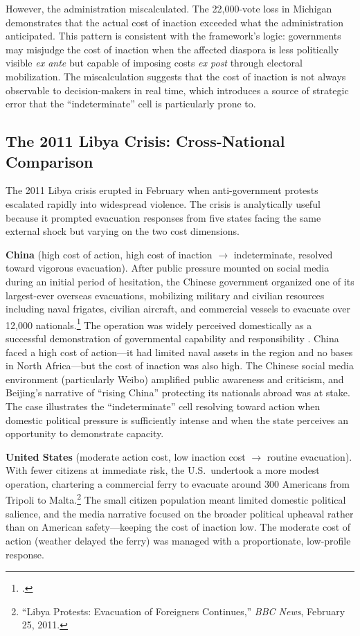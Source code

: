 \documentclass[12pt]{article}
\begin{document}
However, the administration miscalculated. The 22,000-vote loss in Michigan demonstrates that the actual cost of inaction exceeded what the administration anticipated. This pattern is consistent with the framework's logic: governments may misjudge the cost of inaction when the affected diaspora is less politically visible \emph{ex ante} but capable of imposing costs \emph{ex post} through electoral mobilization. The miscalculation suggests that the cost of inaction is not always observable to decision-makers in real time, which introduces a source of strategic error that the ``indeterminate'' cell is particularly prone to.

\subsection{The 2011 Libya Crisis: Cross-National Comparison}

The 2011 Libya crisis erupted in February when anti-government protests escalated rapidly into widespread violence. The crisis is analytically useful because it prompted evacuation responses from five states facing the same external shock but varying on the two cost dimensions.

\textbf{China} (high cost of action, high cost of inaction $\rightarrow$ indeterminate, resolved toward vigorous evacuation). After public pressure mounted on social media during an initial period of hesitation, the Chinese government organized one of its largest-ever overseas evacuations, mobilizing military and civilian resources including naval frigates, civilian aircraft, and commercial vessels to evacuate over 12,000 nationals.\footnote{\citet{Reuters2011}.} The operation was widely perceived domestically as a successful demonstration of governmental capability and responsibility \citep{Zerba2014}. China faced a high cost of action---it had limited naval assets in the region and no bases in North Africa---but the cost of inaction was also high. The Chinese social media environment (particularly Weibo) amplified public awareness and criticism, and Beijing's narrative of ``rising China'' protecting its nationals abroad was at stake. The case illustrates the ``indeterminate'' cell resolving toward action when domestic political pressure is sufficiently intense and when the state perceives an opportunity to demonstrate capacity.

\textbf{United States} (moderate action cost, low inaction cost $\rightarrow$ routine evacuation). With fewer citizens at immediate risk, the U.S.\ undertook a more modest operation, chartering a commercial ferry to evacuate around 300 Americans from Tripoli to Malta.\footnote{``Libya Protests: Evacuation of Foreigners Continues,'' \emph{BBC News}, February 25, 2011.} The small citizen population meant limited domestic political salience, and the media narrative focused on the broader political upheaval rather than on American safety---keeping the cost of inaction low. The moderate cost of action (weather delayed the ferry) was managed with a proportionate, low-profile response.
\end{document}
